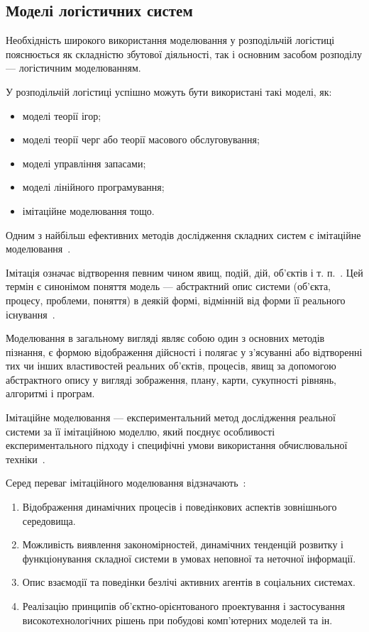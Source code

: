 \subsection{Моделі логістичних систем}
Необхідність широкого використання моделювання у розподільчій логістиці пояснюється як складністю збутової діяльності, так і основним засобом розподілу --- логістичним моделюванням. 

У розподільчій логістиці успішно можуть бути використані такі моделі, як:
\begin{itemize}
	\item моделі теорії ігор; 
	\item моделі теорії черг або теорії масового обслуговування;
	\item моделі управління запасами;
	\item моделі лінійного програмування;
	\item імітаційне моделювання тощо.
\end{itemize}

Одним з найбільш ефективних методів дослідження складних систем є імітаційне моделювання~\cite{Kobelev2003}.

Імітація означає відтворення певним чином явищ, подій, дій, об'єктів і т. п.~\cite{Kobelev2003}. 
Цей термін є синонімом поняття модель --- абстрактний опис системи (об'єкта, процесу, проблеми, поняття) в деякій формі, відмінній від форми її реального існування~\cite{Emelyanov2002}. 

Моделювання в загальному вигляді являє собою один з основних методів пізнання, є формою відображення дійсності і полягає у з'ясуванні або відтворенні тих чи інших властивостей реальних об'єктів, процесів, явищ за допомогою абстрактного опису у вигляді зображення, плану, карти, сукупності рівнянь, алгоритмі і програм.

Імітаційне моделювання --- експериментальний метод дослідження реальної системи за її імітаційною моделлю, який поєднує особливості експериментального підходу і специфічні умови використання обчислювальної техніки~\cite{Emelyanov2002}.

Серед переваг імітаційного моделювання відзначають~\cite{Emelyanov2002}: 
\begin{enumerate}
	\item Відображення динамічних процесів і поведінкових аспектів зовнішнього середовища.
	\item Можливість виявлення закономірностей, динамічних тенденцій розвитку і функціонування складної системи в умовах неповної та неточної інформації.
	\item Опис взаємодії та поведінки безлічі активних агентів в соціальних системах.
	\item Реалізацію принципів об'єктно-орієнтованого проектування і застосування високотехнологічних рішень при побудові комп'ютерних моделей та ін.
\end{enumerate}

